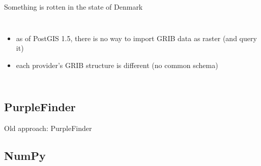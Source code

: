 \documentclass[xcolor=svgnames]{beamer}
\begin{document}
\begin{frame}{Something is rotten in the state of Denmark}
\begin{columns}[c]
{\begin{itemize}
                        \item as of PostGIS 1.5, there is no way to import GRIB data as raster (and query it)
                        \item each provider's GRIB structure is different (no common schema)\\\vspace{0.1\textheight}
                    \end{itemize}
                }
            \end{columns}
        \end{frame}

    \subsection{PurpleFinder}

        \begin{frame}{Old approach: PurpleFinder}
        \end{frame}

    \subsection{NumPy}
\end{document}
